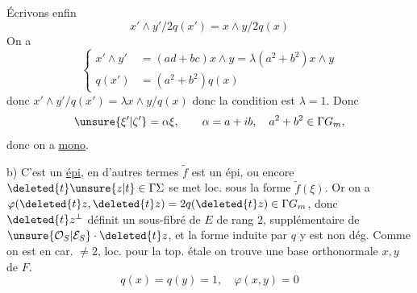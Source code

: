 
Écrivons enfin
\[
x'\wedge y'/2q(x')=x\wedge y/2q(x)
\]
On a
\[
\left\{\begin{aligned}x'\wedge y'&=(ad+bc)x\wedge y=\lambda(a^2+b^2)x\wedge y\\q(x')&=(a^2+b^2)q(x)\end{aligned}\right.
\]
donc $x'\wedge y'/q(x')=\lambda x\wedge y/q(x)$ donc la condition est $\lambda=1$. Donc
\[
\unsure{\xi'|\zeta'}=\alpha\xi,\qquad\alpha=a+ib,\quad a^2+b^2\in\Gamma G_m,
\]
donc on a \uline{mono}.

b) C'est un \uline{épi}, en d'autres termes  $\widetilde f$ est un épi, ou encore  $\deleted{t}\unsure{z|t}\in\Gamma\Sigma$ se met loc. sous la forme $\widetilde f(\xi)$. Or on a $\varphi(\deleted{t}z,\deleted{t}z)=2q(\deleted{t}z)\in\Gamma G_m$, donc $\deleted{t}z^\perp$ définit un sous-fibré de
$E$ de rang $2$,  supplémentaire de $\unsure{\mathcal O_S|\mathcal E_S}\cdot\deleted{t}z$,  et la forme induite par $q$ y est non dég. Comme on est en car. $\ne2$, loc. pour la top. étale on trouve une base orthonormale $x,y$ de $F$.
\[
q(x)=q(y)=1,\quad\varphi(x,y)=0
\]
